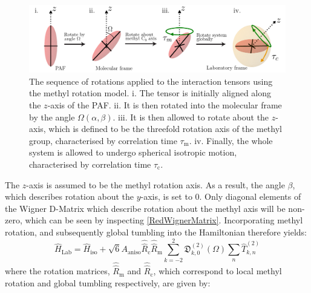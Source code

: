 \begin{figure}
\centering
\includegraphics[scale=0.65]{./Figures/SimonsFigs/Rotations.pdf}
\caption{The sequence of rotations applied to the interaction tensors using the methyl rotation model. i. The tensor is initially aligned along the $z$-axis of the PAF. ii. It is then rotated into the molecular frame by the angle $\Omega(\alpha,\beta)$. iii. It is then allowed to rotate about the $z$-axis, which is defined to be the threefold rotation axis of the methyl group, characterised by correlation time $\tau_{\text{m}}$. iv. Finally, the whole system is allowed to undergo spherical isotropic motion, characterised by correlation time $\tau_{\text{c}}$.}
\label{Rotations}
\end{figure}
The $z$-axis is assumed to be the methyl rotation axis. As a result,  the angle $\beta$, which describes rotation about the $y$-axis, is set to $0$. Only diagonal elements of the Wigner D-Matrix which describe rotation about the methyl axis will be non-zero, which can be seen by inspecting \ref{RedWignerMatrix}. Incorporating methyl rotation, and subsequently global tumbling into the Hamiltonian therefore yields:
\begin{equation}
\hat{H}_{\text{Lab}} = \hat{H}_{\text{iso}} + \sqrt{6} A_{\text{aniso}} \hat{\hat{R}}_{\text{c}} \hat{\hat{R}}_{\text{m}} \sum \limits_{k = -2}^2 \mathfrak{D}_{k,0}^{(2)}(\Omega) \sum \limits_n \hat{T}_{k,n}^{(2)}
\end{equation}
where the rotation matrices, $\hat{\hat{R}}_{\text{m}}$  and $\hat{\hat{R}}_{\text{c}}$, which correspond to local methyl rotation and global tumbling respectively, are given by:
\scriptsize

